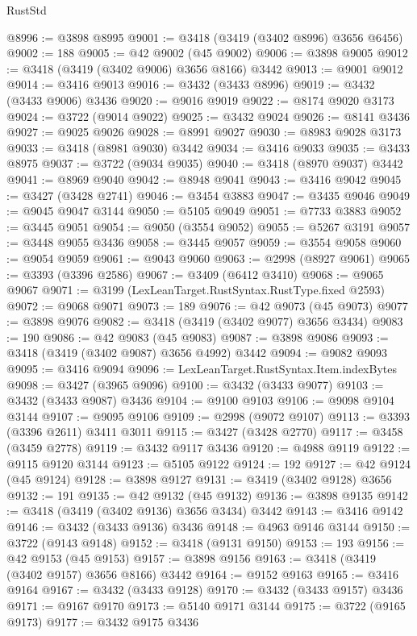 \begin{lexlean}{RustStd}
\begin{coremodule}
@8996 := @3898 @8995
@9001 := @3418 (@3419 (@3402 @8996) @3656 @6456)
@9002 := 188
@9005 := @42 @9002 (@45 @9002)
@9006 := @3898 @9005
@9012 := @3418 (@3419 (@3402 @9006) @3656 @8166) @3442
@9013 := @9001 @9012
@9014 := @3416 @9013
@9016 := @3432 (@3433 @8996)
@9019 := @3432 (@3433 @9006) @3436
@9020 := @9016 @9019
@9022 := @8174 @9020 @3173
@9024 := @3722 (@9014 @9022)
@9025 := @3432 @9024
@9026 := @8141 @3436
@9027 := @9025 @9026
@9028 := @8991 @9027
@9030 := @8983 @9028 @3173
@9033 := @3418 (@8981 @9030) @3442
@9034 := @3416 @9033
@9035 := @3433 @8975
@9037 := @3722 (@9034 @9035)
@9040 := @3418 (@8970 @9037) @3442
@9041 := @8969 @9040
@9042 := @8948 @9041
@9043 := @3416 @9042
@9045 := @3427 (@3428 @2741)
@9046 := @3454 @3883
@9047 := @3435 @9046
@9049 := @9045 @9047 @3144
@9050 := @5105 @9049
@9051 := @7733 @3883
@9052 := @3445 @9051
@9054 := @9050 (@3554 @9052)
@9055 := @5267 @3191
@9057 := @3448 @9055 @3436
@9058 := @3445 @9057
@9059 := @3554 @9058
@9060 := @9054 @9059
@9061 := @9043 @9060
@9063 := @2998 (@8927 @9061)
@9065 := @3393 (@3396 @2586)
@9067 := @3409 (@6412 @3410)
@9068 := @9065 @9067
@9071 := @3199 (LexLeanTarget.RustSyntax.RustType.fixed @2593)
@9072 := @9068 @9071
@9073 := 189
@9076 := @42 @9073 (@45 @9073)
@9077 := @3898 @9076
@9082 := @3418 (@3419 (@3402 @9077) @3656 @3434)
@9083 := 190
@9086 := @42 @9083 (@45 @9083)
@9087 := @3898 @9086
@9093 := @3418 (@3419 (@3402 @9087) @3656 @4992) @3442
@9094 := @9082 @9093
@9095 := @3416 @9094
@9096 := LexLeanTarget.RustSyntax.Item.indexBytes
@9098 := @3427 (@3965 @9096)
@9100 := @3432 (@3433 @9077)
@9103 := @3432 (@3433 @9087) @3436
@9104 := @9100 @9103
@9106 := @9098 @9104 @3144
@9107 := @9095 @9106
@9109 := @2998 (@9072 @9107)
@9113 := @3393 (@3396 @2611) @3411 @3011
@9115 := @3427 (@3428 @2770)
@9117 := @3458 (@3459 @2778)
@9119 := @3432 @9117 @3436
@9120 := @4988 @9119
@9122 := @9115 @9120 @3144
@9123 := @5105 @9122
@9124 := 192
@9127 := @42 @9124 (@45 @9124)
@9128 := @3898 @9127
@9131 := @3419 (@3402 @9128) @3656
@9132 := 191
@9135 := @42 @9132 (@45 @9132)
@9136 := @3898 @9135
@9142 := @3418 (@3419 (@3402 @9136) @3656 @3434) @3442
@9143 := @3416 @9142
@9146 := @3432 (@3433 @9136) @3436
@9148 := @4963 @9146 @3144
@9150 := @3722 (@9143 @9148)
@9152 := @3418 (@9131 @9150)
@9153 := 193
@9156 := @42 @9153 (@45 @9153)
@9157 := @3898 @9156
@9163 := @3418 (@3419 (@3402 @9157) @3656 @8166) @3442
@9164 := @9152 @9163
@9165 := @3416 @9164
@9167 := @3432 (@3433 @9128)
@9170 := @3432 (@3433 @9157) @3436
@9171 := @9167 @9170
@9173 := @5140 @9171 @3144
@9175 := @3722 (@9165 @9173)
@9177 := @3432 @9175 @3436

\end{coremodule}
\end{lexlean}
